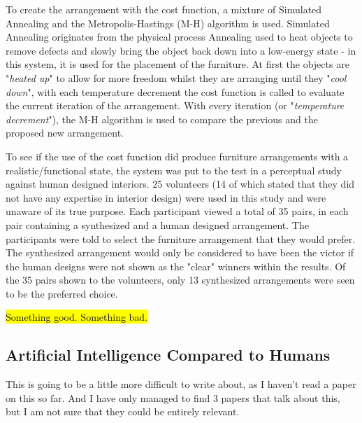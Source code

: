 To create the arrangement with the cost function, a mixture of Simulated Annealing and the Metropolis-Hastings (M-H) algorithm is used. Simulated Annealing originates from the physical process Annealing used to heat objects to remove defects and slowly bring the object back down into a low-energy state \cite{simulated-annealing} - in this system, it is used for the placement of the furniture. At first the objects are "\textit{heated up}" to allow for more freedom whilst they are arranging until they "\textit{cool down}", with each temperature decrement the cost function is called to evaluate the current iteration of the arrangement. With every iteration (or "\textit{temperature decrement}"), the M-H algorithm \cite{understanding-mh-algorithm} is used to compare the previous and the proposed new arrangement.


To see if the use of the cost function did produce furniture arrangements with a realistic/functional state, the system was put to the test in a perceptual study against human designed interiors. 25 volunteers (14 of which stated that they did not have any expertise in interior design) were used in this study and were unaware of its true purpose. Each participant viewed a total of 35 pairs, in each pair containing a synthesized and a human designed arrangement. The participants were told to select the furniture arrangement that they would prefer. The synthesized arrangement would only be considered to have been the victor if the human designs were not shown as the "clear" winners within the results. Of the 35 pairs shown to the volunteers, only 13 synthesized arrangements were seen to be the preferred choice.

\hl{Something good. Something bad.}

\bigskip

\subsection{Artificial Intelligence Compared to Humans}
This is going to be a little more difficult to write about, as I haven't read a paper on this so far. And I have only managed to find 3 papers that talk about this, but I am not sure that they could be entirely relevant.